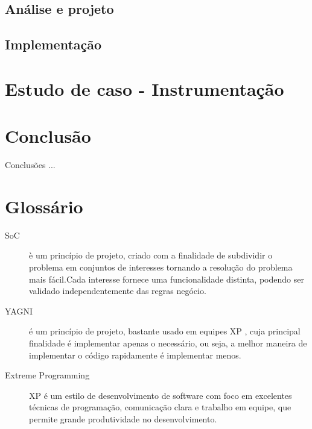 \documentclass[tc,openright]{iiufrgs}
\begin{document}
\section{Análise e projeto}

\section{Implementação}

\chapter{Estudo de caso - Instrumentação}

\chapter{Conclusão}

Conclusões ...



\chapter*{Glossário}

\begin{description}
	\item[SoC] è um princípio de projeto, criado com a finalidade de subdividir o problema em conjuntos de interesses tornando a resolução do problema mais fácil.Cada interesse fornece uma funcionalidade distinta, podendo ser validado independentemente das regras negócio.\cite{pressman2010engineering}
	\item [YAGNI] é um princípio de projeto, bastante usado em equipes XP , cuja principal finalidade é implementar apenas o necessário, ou seja, a melhor maneira de implementar o código rapidamente é implementar menos.
	\item[Extreme Programming] XP é um estilo de desenvolvimento de software com foco em excelentes técnicas de programação, comunicação clara e trabalho em equipe, que permite grande produtividade no desenvolvimento. \cite{beck2004extreme}
\end{description}

\appendix
\end{document}
